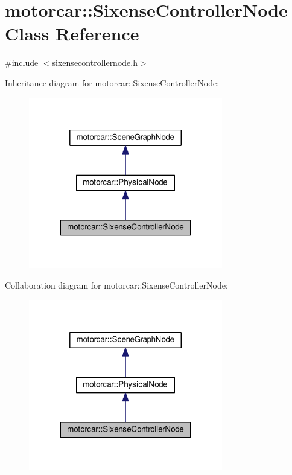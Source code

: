 \hypertarget{classmotorcar_1_1SixenseControllerNode}{\section{motorcar\-:\-:Sixense\-Controller\-Node Class Reference}
\label{classmotorcar_1_1SixenseControllerNode}
}


{\ttfamily \#include $<$sixensecontrollernode.\-h$>$}



Inheritance diagram for motorcar\-:\-:Sixense\-Controller\-Node\-:
\nopagebreak
\begin{figure}[H]
\begin{center}
\leavevmode
\includegraphics[width=240pt]{classmotorcar_1_1SixenseControllerNode__inherit__graph}
\end{center}
\end{figure}


Collaboration diagram for motorcar\-:\-:Sixense\-Controller\-Node\-:
\nopagebreak
\begin{figure}[H]
\begin{center}
\leavevmode
\includegraphics[width=240pt]{classmotorcar_1_1SixenseControllerNode__coll__graph}
\end{center}
\end{figure}
